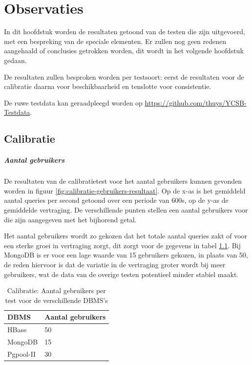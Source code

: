 \chapter{Observaties}
In dit hoofdstuk worden de resultaten getoond van de testen die zijn uitgevoerd, met een bespreking van de speciale elementen. Er zullen nog geen redenen aangehaald of conclusies getrokken worden, dit wordt in het volgende hoofdstuk gedaan. 

De resultaten zullen besproken worden per testsoort: eerst de resultaten voor de calibratie daarna voor beschikbaarheid en tenslotte voor consistentie. 

De ruwe testdata kan geraadpleegd worden op \url{https://github.com/thuys/YCSB-Testdata}. 

\section{Calibratie}

\paragraph{Aantal gebruikers}
De resultaten van de calibratietest voor het aantal gebruikers kunnen gevonden worden in figuur \ref{fig:calibratie-gebruikers-resultaat}. Op de x-as is het gemiddeld aantal queries per second getoond over een periode van 600s, op de y-as de gemiddelde vertraging. De verschillende punten stellen een aantal gebruikers voor die zijn aangegeven met het bijhorend getal. 

Het aantal gebruikers wordt zo gekozen dat het totale aantal queries zakt of voor een sterke groei in vertraging zorgt, dit zorgt voor de gegevens in tabel \ref{table:calibratie-gebruikers-resultaat}. Bij MongoDB is er voor een lage waarde van 15 gebruikers gekozen, in plaats van 50, de reden hiervoor is dat de variatie in de vertraging groter wordt bij meer gebruikers, wat de data van de overige testen potentieel minder stabiel maakt.  

\begin{table}[h!]
	\centering
	\begin{tabular}{l| l }
		\textbf{DBMS} & Aantal gebruikers \\
		\hline
		HBase & 50 \\
		MongoDB & 15\\
		Pgpool-II & 30\\
	\end{tabular}
	\caption{Calibratie: Aantal gebruikers per test voor de verschillende DBMS's}
	\label{table:calibratie-gebruikers-resultaat}
\end{table}

